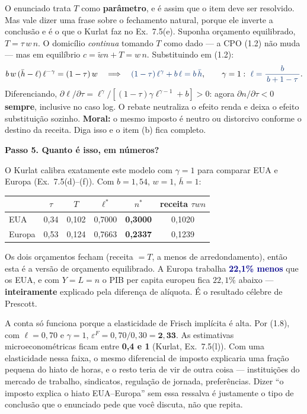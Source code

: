 \documentclass[11pt, a4paper]{article}
\newcommand{\passo}[1]{\medskip\noindent\textbf{#1}\par\nobreak}
\newcommand{\resp}[1]{%
  \ifmmode {\color{darkblue}#1}\else\textcolor{darkblue}{\textbf{#1}}\fi}
\newcommand{\stst}{^{\ast}}
\newcommand{\wt}{\widetilde{w}}
\begin{document}
\begin{tcolorbox}[planbox, title={Extensão que vale meio ponto: e se o governo devolver toda a receita?}]
\small
O enunciado trata $T$ como \textbf{parâmetro}, e é assim que o item deve ser resolvido. Mas
vale dizer uma frase sobre o fechamento natural, porque ele inverte a conclusão e é o que o
Kurlat faz no Ex.\ 7.5(e). Suponha orçamento equilibrado, $T = \tau\,w\,n$. O domicílio
\emph{continua} tomando $T$ como dado --- a CPO (1.2) não muda --- mas em equilíbrio
$c = \wt n + T = w\,n$. Substituindo em (1.2):
\[
b\,w\,(\bar h - \ell)\,\ell^{-\gamma} = (1-\tau)\,w
\quad\Longrightarrow\quad
\resp{(1-\tau)\,\ell^{\gamma} + b\,\ell = b\,\bar h},
\qquad
\gamma = 1:\ \resp{\ell = \frac{b}{\,b+1-\tau\,}} .
\]
Diferenciando, $\partial\ell/\partial\tau = \ell^{\gamma}/[(1-\tau)\gamma\ell^{\gamma-1}+b] > 0$:
agora $\partial n/\partial\tau < 0$ \textbf{sempre}, inclusive no caso log. O rebate
neutraliza o efeito renda e deixa o efeito substituição sozinho. \textbf{Moral:} o mesmo
imposto é neutro ou distorcivo conforme o destino da receita. Diga isso e o item (b) fica
completo.
\end{tcolorbox}

\passo{Passo 5. Quanto é isso, em números?}
O Kurlat calibra exatamente este modelo com $\gamma=1$ para comparar EUA e Europa
(Ex.\ 7.5(d)--(f)). Com $b = 1{,}54$, $w=1$, $\bar h = 1$:

\begin{center}
\small
\begin{tabular}{@{}lccccc@{}}
\toprule
& $\tau$ & $T$ & $\ell\stst$ & $n\stst$ & receita $\tau w n$ \\
\midrule
EUA & 0{,}34 & 0{,}102 & 0{,}7000 & \textbf{0{,}3000} & 0{,}1020 \\
Europa & 0{,}53 & 0{,}124 & 0{,}7663 & \textbf{0{,}2337} & 0{,}1239 \\
\bottomrule
\end{tabular}
\end{center}

Os dois orçamentos fecham (receita $=T$, a menos de arredondamento), então esta é a versão
de orçamento equilibrado. A Europa trabalha \resp{22{,}1\% menos} que os EUA, e com
$Y = L = n$ o PIB per capita europeu fica $22{,}1\%$ abaixo --- \textbf{inteiramente}
explicado pela diferença de alíquota. É o resultado célebre de Prescott.

\begin{tcolorbox}[trapbox, title={O que essa conta NÃO prova}]
\small
A conta só funciona porque a elasticidade de Frisch implícita é alta. Por (1.8), com
$\ell = 0{,}70$ e $\gamma=1$, $\varepsilon^F = 0{,}70/0{,}30 = \mathbf{2{,}33}$. As
estimativas microeconométricas ficam entre \textbf{0,4 e 1} (Kurlat, Ex.\ 7.5(l)). Com uma
elasticidade nessa faixa, o mesmo diferencial de imposto explicaria uma fração pequena do
hiato de horas, e o resto teria de vir de outra coisa --- instituições do mercado de
trabalho, sindicatos, regulação de jornada, preferências. Dizer ``o imposto explica o
hiato EUA--Europa'' sem essa ressalva é justamente o tipo de conclusão que o enunciado
pede que você discuta, não que repita.
\end{tcolorbox}
\end{document}
